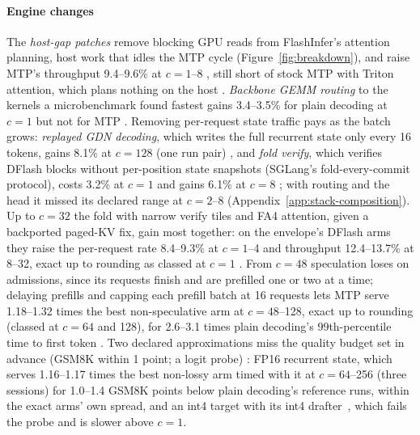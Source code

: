 \paragraph{Engine changes} The \emph{host-gap patches} remove blocking GPU reads from FlashInfer's attention planning, host work that idles the MTP cycle (Figure~\ref{fig:breakdown}), and raise MTP's throughput 9.4--9.6\% at $c=1$--8 , still short of stock MTP with Triton attention, which plans nothing on the host . \emph{Backbone GEMM routing} to the kernels a microbenchmark found fastest gains 3.4--3.5\% for plain decoding at $c=1$ but not for MTP . Removing per-request state traffic pays as the batch grows: \emph{replayed GDN decoding}, which writes the full recurrent state only every 16 tokens, gains 8.1\% at $c=128$ (one run pair) , and \emph{fold verify}, which verifies DFlash blocks without per-position state snapshots (SGLang's fold-every-commit protocol), costs 3.2\% at $c=1$ and gains 6.1\% at $c=8$ ; with routing and the head it missed its declared range at $c=2$--8 (Appendix~\ref{app:stack-composition}). Up to $c=32$ the fold with narrow verify tiles and FA4 attention, given a backported paged-KV fix, gain most together: on the envelope's DFlash arms they raise the per-request rate 8.4--9.3\% at $c=1$--4 and throughput 12.4--13.7\% at 8--32, exact up to rounding as classed at $c=1$ . From $c=48$ speculation loses on admissions, since its requests finish and are prefilled one or two at a time; delaying prefills and capping each prefill batch at 16 requests lets MTP serve 1.18--1.32 times the best non-speculative arm at $c=48$--128, exact up to rounding (classed at $c=64$ and 128), for 2.6--3.1 times plain decoding's 99th-percentile time to first token . Two declared approximations miss the quality budget set in advance (GSM8K within 1 point; a logit probe) : FP16 recurrent state, which serves 1.16--1.17 times the best non-lossy arm timed with it at $c=64$--256 (three sessions) for 1.0--1.4 GSM8K points below plain decoding's reference runs, within the exact arms' own spread, and an int4 target with its int4 drafter~\cite{nota2026}, which fails the probe and is slower above $c=1$.


